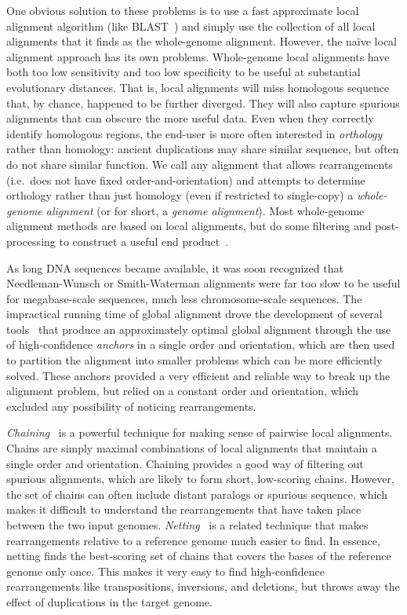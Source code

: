 \documentclass[fleqn,10pt]{wlscirep}
\begin{document}
One obvious solution to these problems is to use a fast approximate local alignment algorithm (like BLAST~\cite{blast}) and simply use the collection of all local alignments that it finds as the whole-genome alignment.
However, the naïve local alignment approach has its own problems.
Whole-genome local alignments have both too low sensitivity and too low specificity to be useful at substantial evolutionary distances.
That is, local alignments will miss homologous sequence that, by chance, happened to be further diverged.
They will also capture spurious alignments that can obscure the more useful data.
Even when they correctly identify homologous regions, the end-user is more often interested in \emph{orthology} rather than homology: ancient duplications may share similar sequence, but often do not share similar function.
We call any alignment that allows rearrangements (i.e.\ does not have fixed order-and-orientation) and attempts to determine orthology rather than just homology (even if restricted to single-copy) a \emph{whole-genome alignment} (or for short, a \emph{genome alignment}).
Most whole-genome alignment methods are based on local alignments, but do some filtering and post-processing to construct a useful end product~\cite{Batzoglou2005}.

As long DNA sequences became available, it was soon recognized that Needleman-Wunsch or Smith-Waterman alignments were far too slow to be useful for megabase-scale sequences, much less chromosome-scale sequences.
The impractical running time of global alignment drove the development of several tools~\cite{avid,mummer,lagan} that produce an approximately optimal global alignment through the use of high-confidence \emph{anchors} in a single order and orientation, which are then used to partition the alignment into smaller problems which can be more efficiently solved.
These anchors provided a very efficient and reliable way to break up the alignment problem, but relied on a constant order and orientation, which excluded any possibility of noticing rearrangements.

\emph{Chaining}~\cite{evoCauldron} is a powerful technique for making sense of pairwise local alignments.
Chains are simply maximal combinations of local alignments that maintain a single order and orientation.
Chaining provides a good way of filtering out spurious alignments, which are likely to form short, low-scoring chains.
However, the set of chains can often include distant paralogs or spurious sequence, which makes it difficult to understand the rearrangements that have taken place between the two input genomes.
\emph{Netting}~\cite{evoCauldron} is a related technique that makes rearrangements relative to a reference genome much easier to find.
In essence, netting finds the best-scoring set of chains that covers the bases of the reference genome only once.
This makes it very easy to find high-confidence rearrangements like transpositions, inversions, and deletions, but throws away the effect of duplications in the target genome.
\end{document}
